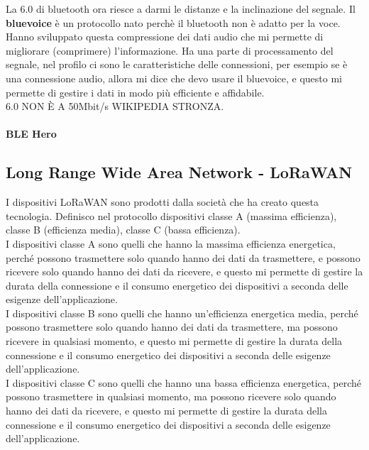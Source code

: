 La 6.0 di bluetooth ora riesce a darmi le distanze e la inclinazione del segnale. Il \textbf{bluevoice} è un protocollo nato perchè il bluetooth non è adatto per la voce. Hanno sviluppato questa compressione dei dati audio che mi permette di migliorare (comprimere) l'informazione. Ha una parte di processamento del segnale, nel profilo ci sono le caratteristiche delle connessioni, per esempio se è una connessione audio, allora mi dice che devo usare il bluevoice, e questo mi permette di gestire i dati in modo più efficiente e affidabile.\\

6.0 NON È A 50Mbit/s WIKIPEDIA STRONZA.\\

\paragraph{BLE Hero}

\subsection{Long Range Wide Area Network - LoRaWAN}
I dispositivi LoRaWAN sono prodotti dalla società che ha creato questa tecnologia. Definisco nel protocollo dispositivi classe A (massima efficienza), classe B (efficienza media), classe C (bassa efficienza).\\
I dispositivi classe A sono quelli che hanno la massima efficienza energetica, perché possono trasmettere solo quando hanno dei dati da trasmettere, e possono ricevere solo quando hanno dei dati da ricevere, e questo mi permette di gestire la durata della connessione e il consumo energetico dei dispositivi a seconda delle esigenze dell'applicazione.\\
I dispositivi classe B sono quelli che hanno un'efficienza energetica media, perché possono trasmettere solo quando hanno dei dati da trasmettere, ma possono ricevere in qualsiasi momento, e questo mi permette di gestire la durata della connessione e il consumo energetico dei dispositivi a seconda delle esigenze dell'applicazione.\\
I dispositivi classe C sono quelli che hanno una bassa efficienza energetica, perché possono trasmettere in qualsiasi momento, ma possono ricevere solo quando hanno dei dati da ricevere, e questo mi permette di gestire la durata della connessione e il consumo energetico dei dispositivi a seconda delle esigenze dell'applicazione.\\

